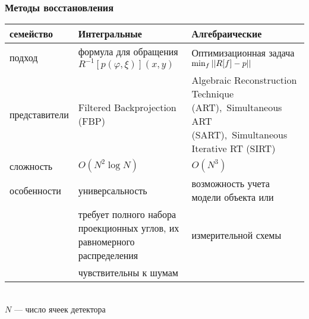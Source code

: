 \begingroup
\small
\begin{frame}
\frametitle{Методы восстановления}
\begin{tabular}{p{} | p{} | p{}}
\hspace{-1cm} семейство & Интегральные & Алгебраические \\ \hline \vspace{10pt}
\hspace{-1cm} подход & формула для обращения $R^{-1}[p(\varphi, \xi)](x,y)$ & Оптимизационная задача $\min_{f} \left|\left| R[f] - p \right|\right|$\\ \hline \vspace{5pt}
\hspace{-1cm} представители & \footnotesize{Filtered Backprojection (FBP)} & \footnotesize{Algebraic Reconstruction Technique (ART),\ Simultaneous ART (SART),\ Simultaneous Iterative RT (SIRT) }\\ \hline \vspace{3pt}
\hspace{-1cm} сложность & $O(N^2 \log N)$ & $O(N^3)$ \\ \hline \vspace{5pt}
\hspace{-1cm} особенности & универсальность & возможность учета модели объекта или \\
                          & требует полного набора проекционных углов, их равномерного распределения  & измерительной схемы \\ 
                          & чувствительны к шумам & \\
\end{tabular}
\\
\vspace{3pt}
$N$ --- число ячеек детектора
\end{frame}
\endgroup

